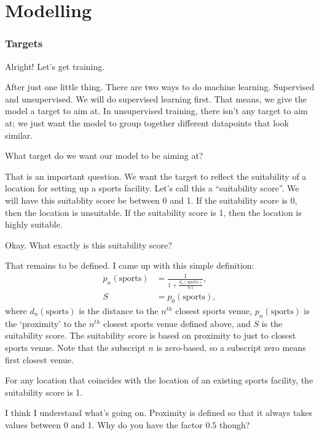 \chapter{Modelling}


\subsection{Targets}
{\color{blue} Alright! Let's get training.}

After just one little thing. There are two ways to do machine learning. Supervised and unsupervised. We will do supervised learning first. That means, we give the model a target to aim at. In unsupervised training, there isn't any target to aim at; we just want the model to group together different datapoints that look similar. 

{\color{blue} What target do we want our model to be aiming at?}

That is an important question. We want the target to reflect the suitability of a location for setting up a sports facility. Let's call this a ``suitability score''. We will have this suitablity score be between 0 and 1. If the suitability score is 0, then the location is unsuitable. If the suitability score is 1, then the location is highly suitable. 

{\color{blue} Okay. What exactly is this suitability score?}

That remains to be defined. I came up with this simple definition:
\begin{equation}
	\begin{aligned}
		p_n(\text{sports}) &= \frac{1}{1+\frac{d_n(\text{sports})}{0.5}}, \\
		S &= p_0(\text{sports}),
	\end{aligned}
\end{equation}
where $d_n(\text{sports})$ is the distance to the $n^{th}$ closest sports venue, $p_n(\text{sports})$ is the `proximity' to the $n^{th}$ closest sports venue defined above, and $S$ is the suitability score. The suitability score is based on proximity to just to closest sports venue. Note that the subscript $n$ is zero-based, so a subscript zero means first closest venue. 

For any location that coincides with the location of an existing sports facility, the suitability score is 1. 

{\color{blue} I think I understand what's going on. Proximity is defined so that it always takes values between 0 and 1. Why do you have the factor $0.5$ though?}

